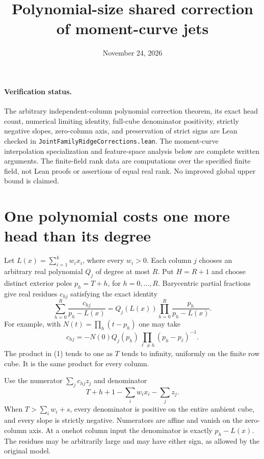 \documentclass{article}
\begin{document}
\title{Polynomial-size shared correction of moment-curve jets}
\author{}
\date{November 24, 2026}
\maketitle

\paragraph{Verification status.}
The arbitrary independent-column polynomial correction theorem, its exact
head count, numerical limiting identity, full-cube denominator positivity,
strictly negative slopes, zero-column axis, and preservation of strict
signs are Lean checked in \texttt{JointFamilyRidgeCorrections.lean}.
The moment-curve interpolation specialization and feature-space analysis
below are complete written arguments. The finite-field rank data are
computations over the specified finite field, not Lean proofs or assertions
of equal real rank. No improved global upper bound is claimed.

\section{One polynomial costs one more head than its degree}
Let $L(x)=\sum_{i=1}^k w_i x_i$, where every $w_i>0$. Each column
$j$ chooses an arbitrary real polynomial $Q_j$ of degree at most $R$.
Put $H=R+1$ and choose distinct exterior poles
$p_h=T+h$, for $h=0,\ldots,R$. Barycentric partial fractions give
real residues $c_{hj}$ satisfying the exact identity
\[
 \sum_{h=0}^R\frac{c_{hj}}{p_h-L(x)}
 =Q_j(L(x))\prod_{h=0}^R\frac{p_h}{p_h-L(x)}.
 \tag{1}
\]
For example, with $N(t)=\prod_h(t-p_h)$ one may take
\[
 c_{hj}=-N(0)Q_j(p_h)\prod_{\ell\ne h}(p_h-p_\ell)^{-1}.
\]
The product in (1) tends to one as $T$ tends to infinity, uniformly
on the finite row cube. It is the same product for every column.

Use the numerator $\sum_jc_{hj}z_j$ and denominator
\[
 T+h+1-\sum_iw_ix_i-\sum_jz_j.
\]
When $T>\sum_iw_i+s$, every denominator is positive on the entire
ambient cube, and every slope is strictly negative. Numerators are affine
and vanish on the zero-column axis. At a onehot column input the
denominator is exactly $p_h-L(x)$. The residues may be arbitrarily large
and may have either sign, as allowed by the original model.
\end{document}
